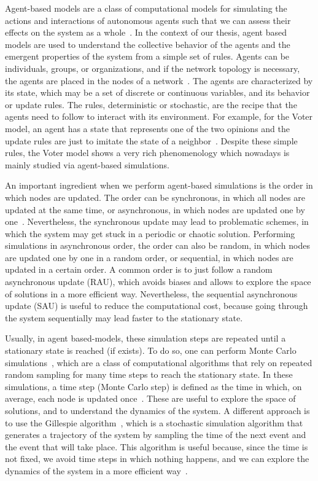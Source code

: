 Agent-based models are a class of computational models for simulating the actions and interactions of autonomous agents such that we can assess their effects on the system as a whole~\cite{duffy-1998, bonabeau-2002}. In the context of our thesis, agent based models are used to understand the collective behavior of the agents and the emergent properties of the system from a simple set of rules. Agents can be individuals, groups, or organizations, and if the network topology is necessary, the agents are placed in the nodes of a network~\cite{macal-2010, railsback-2011}. The agents are characterized by its state, which may be a set of  discrete or continuous variables, and its behavior or update rules. The rules, deterministic or stochastic, are the recipe that the agents need to follow to interact with its environment. For example, for the Voter model, an agent has a state that represents one of the two opinions and the update rules are just to imitate the state of a neighbor~\cite{castellano2009statistical}. Despite these simple rules, the Voter model shows a very rich phenomenology which nowadays is mainly studied via agent-based simulations.

An important ingredient when we perform agent-based simulations is the order in which nodes are updated. The order can be synchronous, in which all nodes are updated at the same time, or asynchronous, in which nodes are updated one by one~\cite{macal-2010, railsback-2011}. Nevertheless, the synchronous update may lead to problematic schemes, in which the system may get stuck in a periodic or chaotic solution. Performing simulations in asynchronous order, the order can also be random, in which nodes are updated one by one in a random order, or sequential, in which nodes are updated in a certain order. A common order is to just follow a random asynchronous update (RAU), which avoids biases and allows to explore the space of solutions in a more efficient way. Nevertheless, the sequential asynchronous update (SAU) is useful to reduce the computational cost, because going through the system sequentially may lead faster to the stationary state.

Usually, in agent based-models, these simulation steps are repeated until a stationary state is reached (if exists). To do so, one can perform Monte Carlo simulations~\cite{metropolis-1949,cronin2006monte}, which are a class of computational algorithms that rely on repeated random sampling for many time steps to reach the stationary state. In these simulations, a time step (Monte Carlo step) is defined as the time in which, on average, each node is updated once~\cite{newman-1999, landau-2014}. These are useful to explore the space of solutions, and to understand the dynamics of the system. A different approach is to use the Gillespie algorithm~\cite{gillespie-1977}, which is a stochastic simulation algorithm that generates a trajectory of the system by sampling the time of the next event and the event that will take place. This algorithm is useful because, since the time is not fixed, we avoid time steps in which nothing happens, and we can explore the dynamics of the system in a more efficient way~\cite{gibson-2000}.

